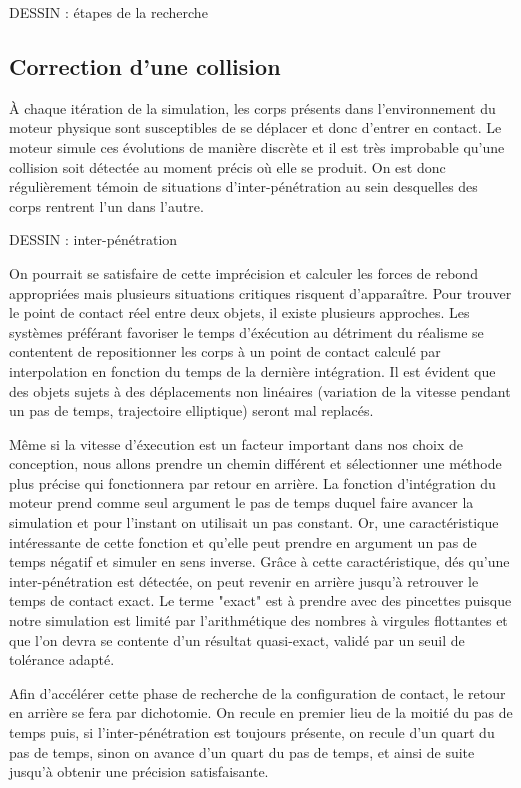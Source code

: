 DESSIN : étapes de la recherche

\subsection{Correction d'une collision}

\`A chaque itération de la simulation, les corps présents dans l'environnement du moteur physique sont susceptibles de se déplacer et donc d'entrer en contact. Le moteur simule ces évolutions de manière discrète et il est très improbable qu'une collision soit détectée au moment précis o\`u elle se produit. On est donc régulièrement témoin de situations d'inter-pénétration au sein desquelles des corps rentrent l'un dans l'autre.

DESSIN : inter-pénétration

On pourrait se satisfaire de cette imprécision et calculer les forces de rebond appropriées mais plusieurs situations critiques risquent d'apparaître. Pour trouver le point de contact réel entre deux objets, il existe plusieurs approches. Les systèmes préférant favoriser le temps d'éxécution au détriment du réalisme se contentent de repositionner les corps à un point de contact calculé par interpolation en fonction du temps de la dernière intégration. Il est évident que des objets sujets à des déplacements non linéaires (variation de la vitesse pendant un pas de temps, trajectoire elliptique) seront mal replacés.

Même si la vitesse d'éxecution est un facteur important dans nos choix de conception, nous allons prendre un chemin différent et sélectionner une méthode plus précise qui fonctionnera par retour en arrière. La fonction d'intégration du moteur prend comme seul argument le pas de temps duquel faire avancer la simulation et pour l'instant on utilisait un pas constant. Or, une caractéristique intéressante de cette fonction et qu'elle peut prendre en argument un pas de temps négatif et simuler en sens inverse. Grâce à cette caractéristique, dés qu'une inter-pénétration est détectée, on peut revenir en arrière jusqu'à retrouver le temps de contact exact. Le terme "exact" est à prendre avec des pincettes puisque notre simulation est limité par l'arithmétique des nombres à virgules flottantes et que l'on devra se contente d'un résultat quasi-exact, validé par un seuil de tolérance adapté.

Afin d'accélérer cette phase de recherche de la configuration de contact, le retour en arrière se fera par dichotomie. On recule en premier lieu de la moitié du pas de temps puis, si l'inter-pénétration est toujours présente, on recule d'un quart du pas de temps, sinon on avance d'un quart du pas de temps, et ainsi de suite jusqu'à obtenir une précision satisfaisante.

